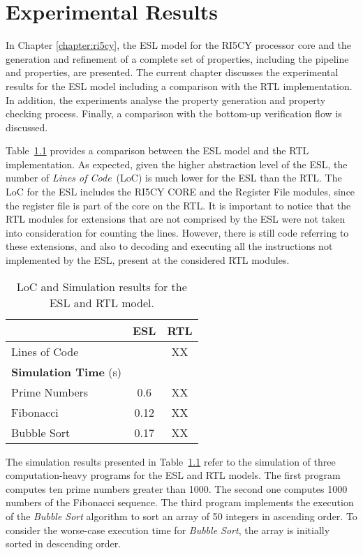 \chapter{Experimental Results}

In Chapter \ref{chapter:ri5cy}, the ESL model for the RI5CY processor core and the generation and refinement of a complete set of properties, including the pipeline and \SSQED{} properties, are presented. The current chapter discusses the experimental results for the ESL model including a comparison with the RTL implementation. In addition, the experiments analyse the property generation and property checking process. Finally, a comparison with the bottom-up verification flow is discussed.

Table~\ref{tab:esl-rtl-comp} provides a comparison between the ESL model and the RTL implementation. As expected, given the higher abstraction level of the ESL, the number of \textit{Lines of Code}~(LoC) is much lower for the ESL than the RTL. The LoC for the ESL includes the RI5CY CORE and the Register File modules, since the register file is part of the core on the RTL. It is important to notice that the RTL modules for extensions that are not comprised by the ESL were not taken into consideration for counting the lines. However, there is still code referring to these extensions, and also to decoding and executing all the instructions not implemented by the ESL, present at the considered RTL modules.

\begin{table}[htb!] 
	\centering 
	\caption{LoC and Simulation results for the ESL and RTL model.} 
	\label{tab:esl-rtl-comp}
	\begin{tabular}{p{5cm} c c} 
		  &  \textbf{ESL} & \textbf{RTL} \\     
		\hline	
		Lines of Code  &  \SSSAY{XX} & XX \\
		\hline
		\textbf{Simulation Time} (s) & & \\
		\hline
		Prime Numbers  &  0.6 & XX \\
		Fibonacci  &  0.12 & XX \\
		Bubble Sort  &  0.17 & XX \\
	\end{tabular} 
\end{table}

The simulation results presented in Table~\ref{tab:esl-rtl-comp} refer to the simulation of three computation-heavy programs for the ESL and RTL models. The first program computes ten prime numbers greater than 1000. The second one computes 1000 numbers of the Fibonacci sequence. The third program implements the execution of the \textit{Bubble Sort} algorithm to sort an array of 50 integers in ascending order. To consider the worse-case execution time for \textit{Bubble Sort}, the array is initially sorted in descending order.

